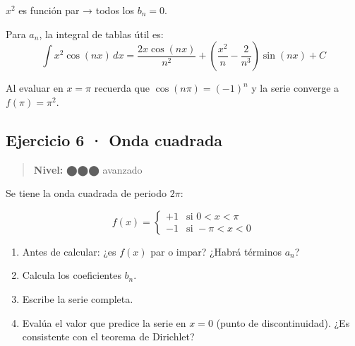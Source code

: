 \documentclass[
  letterpaper,
  DIV=11,
  numbers=noendperiod]{scrreprt}
\providecommand{\tightlist}{%
  \setlength{\itemsep}{0pt}\setlength{\parskip}{0pt}}
\begin{document}
\begin{tcolorbox}[enhanced jigsaw, colbacktitle=quarto-callout-tip-color!10!white, toptitle=1mm, titlerule=0mm, rightrule=.15mm, colframe=quarto-callout-tip-color-frame, leftrule=.75mm, breakable, colback=white, bottomrule=.15mm, coltitle=black, bottomtitle=1mm, title=\textcolor{quarto-callout-tip-color}{\faLightbulb}\hspace{0.5em}{Pista}, arc=.35mm, toprule=.15mm, left=2mm, opacitybacktitle=0.6, opacityback=0]

\(x^2\) es función par → todos los \(b_n = 0\).

Para \(a_n\), la integral de tablas útil es: \[
\int x^2 \cos(nx)\,dx = \frac{2x\cos(nx)}{n^2} + \left(\frac{x^2}{n} - \frac{2}{n^3}\right)\sin(nx) + C
\]

Al evaluar en \(x = \pi\) recuerda que \(\cos(n\pi) = (-1)^n\) y la
serie converge a \(f(\pi) = \pi^2\).

\end{tcolorbox}

\subsection*{Ejercicio 6 · Onda
cuadrada}\label{ejercicio-6-onda-cuadrada}

\begin{quote}
\textbf{Nivel:} ⬤⬤⬤ avanzado
\end{quote}

Se tiene la onda cuadrada de periodo \(2\pi\):

\[
f(x) = \begin{cases} +1 & \text{si } 0 < x < \pi \\ -1 & \text{si } -\pi < x < 0 \end{cases}
\]

\begin{enumerate}
\def\labelenumi{\alph{enumi})}
\tightlist
\item
  Antes de calcular: ¿es \(f(x)\) par o impar? ¿Habrá términos \(a_n\)?
\item
  Calcula los coeficientes \(b_n\).
\item
  Escribe la serie completa.
\item
  Evalúa el valor que predice la serie en \(x = 0\) (punto de
  discontinuidad). ¿Es consistente con el teorema de Dirichlet?
\end{enumerate}
\end{document}
